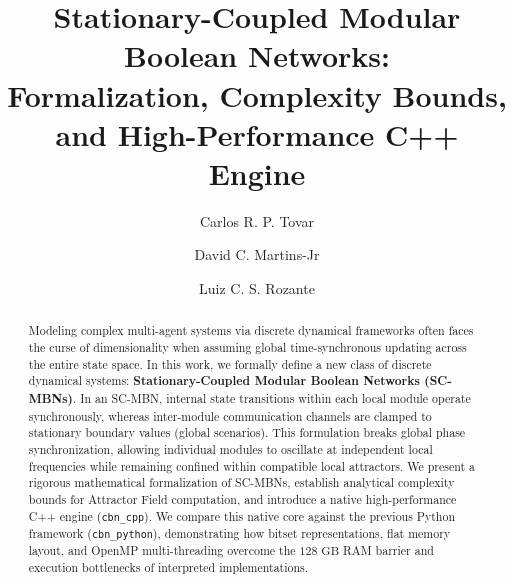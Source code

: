 \documentclass{svproc}
\begin{document}
\title{Stationary-Coupled Modular Boolean Networks:\\Formalization, Complexity Bounds, and High-Performance C++ Engine}


\author{Carlos R. P. Tovar \and David C. Martins-Jr \and Luiz C. S. Rozante}



\maketitle

\begin{abstract}
Modeling complex multi-agent systems via discrete dynamical frameworks often faces the curse of dimensionality when assuming global time-synchronous updating across the entire state space. In this work, we formally define a new class of discrete dynamical systems: \textbf{Stationary-Coupled Modular Boolean Networks (SC-MBNs)}. In an SC-MBN, internal state transitions within each local module operate synchronously, whereas inter-module communication channels are clamped to stationary boundary values (global scenarios). This formulation breaks global phase synchronization, allowing individual modules to oscillate at independent local frequencies while remaining confined within compatible local attractors. We present a rigorous mathematical formalization of SC-MBNs, establish analytical complexity bounds for Attractor Field computation, and introduce a native high-performance C++ engine (\texttt{cbn\_cpp}). We compare this native core against the previous Python framework (\texttt{cbn\_python}), demonstrating how bitset representations, flat memory layout, and OpenMP multi-threading overcome the $128\text{~GB}$ RAM barrier and execution bottlenecks of interpreted implementations.

\end{abstract}

\end{document}
